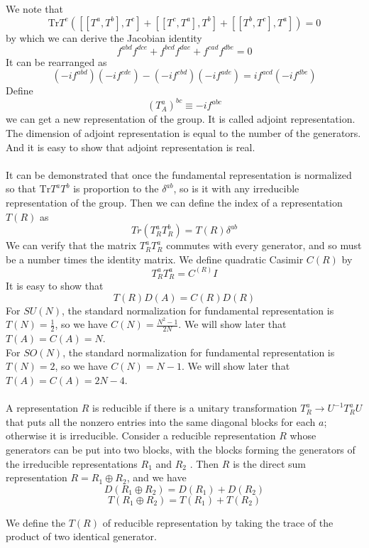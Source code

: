 \documentclass[cyan]{elegantnote}
\begin{document}
\noindent
We note that
\[\mathrm{Tr} T^e\left([[T^a,T^b],T^c] + [[T^c,T^a],T^b] + [[T^b,T^c],T^a] \right) = 0\]
by which we can derive the Jacobian identity
\[f^{abd}f^{dce} + f^{bcd}f^{dae} + f^{cad}f^{dbe} = 0\]
It can be rearranged as 
\[(-if^{abd})(-if^{cde})-(-if^{cbd})(-if^{ade}) = if^{acd} (-if^{dbe})\]
Define
\[(T^a_{A})^{bc} \equiv -if^{abc}\]
we can get a new representation of the group. It is called adjoint representation. The dimension of adjoint representation is equal to the number of the generators. And it is easy to show that adjoint representation is real.
\\ \\
It can be demonstrated that once the fundamental representation is normalized so that $\mathrm{Tr}T^aT^b$ is proportion to the $\delta^{ab}$, so is it with any irreducible representation of the group. Then we can define the index of a representation $T(R)$ as
\[Tr(T^a_R T^b_R) = T(R)\delta^{ab}\]
We can verify that the matrix $T^a_R T^a_R$ commutes with
every generator, and so must be a number times the identity matrix. We define quadratic Casimir $C(R)$ by
\[T^a_R T^a_R = C^(R)I\]
It is easy to show that
\[T(R)D(A) = C(R)D(R)\]
For $SU(N)$, the standard normalization for fundamental representation is $T(N) = \frac{1}{2}$, so we have $C(N) = \frac{N^2-1}{2N}$. We will show later that $T(A) = C(A) = N$. \\
For $SO(N)$, the standard normalization for fundamental representation is $T(N) = 2$, so we have $C(N) = N-1$. We will show later that $T(A) = C(A) = 2N-4$.
\\ \\
A representation $R$ is reducible if there is a unitary transformation $T^a_R \to U^{-1}T^a_RU$ that puts all the nonzero entries into the same diagonal blocks
for each $a$; otherwise it is irreducible. 
Consider a reducible representation $R$ whose generators can be put into two blocks, with the blocks forming the generators of the irreducible representations $R_1$ and $R_2$ . Then $R$ is the direct sum representation $R = R_1\oplus R_2$, and we have
\[D(R_1\oplus R_2) = D(R_1) + D(R_2)\]
\[T(R_1\oplus R_2) = T(R_1) + T(R_2)\]
\begin{note}
We define the $T(R)$ of reducible representation by taking the trace of the product of two identical generator.
\end{note}
\end{document}
